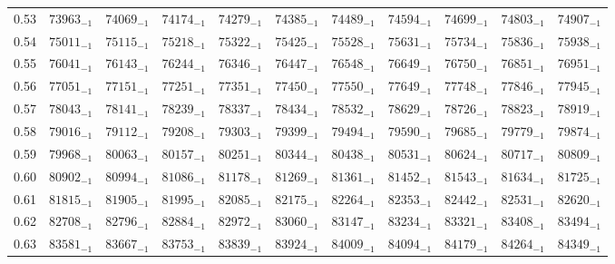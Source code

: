 \documentclass[10pt, a4paper]{article}
\begin{document}
\begin{center}
\begin{longtable}{c || c c c c c | c c c c c}
        0.53 & \({73963}_{-1}\) & \({74069}_{-1}\) & \({74174}_{-1}\) & \({74279}_{-1}\) & \({74385}_{-1}\) & \({74489}_{-1}\) & \({74594}_{-1}\) & \({74699}_{-1}\) & \({74803}_{-1}\) & \({74907}_{-1}\)\\
        0.54 & \({75011}_{-1}\) & \({75115}_{-1}\) & \({75218}_{-1}\) & \({75322}_{-1}\) & \({75425}_{-1}\) & \({75528}_{-1}\) & \({75631}_{-1}\) & \({75734}_{-1}\) & \({75836}_{-1}\) & \({75938}_{-1}\)\\
        0.55 & \({76041}_{-1}\) & \({76143}_{-1}\) & \({76244}_{-1}\) & \({76346}_{-1}\) & \({76447}_{-1}\) & \({76548}_{-1}\) & \({76649}_{-1}\) & \({76750}_{-1}\) & \({76851}_{-1}\) & \({76951}_{-1}\)\\
        0.56 & \({77051}_{-1}\) & \({77151}_{-1}\) & \({77251}_{-1}\) & \({77351}_{-1}\) & \({77450}_{-1}\) & \({77550}_{-1}\) & \({77649}_{-1}\) & \({77748}_{-1}\) & \({77846}_{-1}\) & \({77945}_{-1}\)\\
        0.57 & \({78043}_{-1}\) & \({78141}_{-1}\) & \({78239}_{-1}\) & \({78337}_{-1}\) & \({78434}_{-1}\) & \({78532}_{-1}\) & \({78629}_{-1}\) & \({78726}_{-1}\) & \({78823}_{-1}\) & \({78919}_{-1}\)\\
        0.58 & \({79016}_{-1}\) & \({79112}_{-1}\) & \({79208}_{-1}\) & \({79303}_{-1}\) & \({79399}_{-1}\) & \({79494}_{-1}\) & \({79590}_{-1}\) & \({79685}_{-1}\) & \({79779}_{-1}\) & \({79874}_{-1}\)\\
        0.59 & \({79968}_{-1}\) & \({80063}_{-1}\) & \({80157}_{-1}\) & \({80251}_{-1}\) & \({80344}_{-1}\) & \({80438}_{-1}\) & \({80531}_{-1}\) & \({80624}_{-1}\) & \({80717}_{-1}\) & \({80809}_{-1}\)\\
        \hline
        0.60 & \({80902}_{-1}\) & \({80994}_{-1}\) & \({81086}_{-1}\) & \({81178}_{-1}\) & \({81269}_{-1}\) & \({81361}_{-1}\) & \({81452}_{-1}\) & \({81543}_{-1}\) & \({81634}_{-1}\) & \({81725}_{-1}\)\\
        0.61 & \({81815}_{-1}\) & \({81905}_{-1}\) & \({81995}_{-1}\) & \({82085}_{-1}\) & \({82175}_{-1}\) & \({82264}_{-1}\) & \({82353}_{-1}\) & \({82442}_{-1}\) & \({82531}_{-1}\) & \({82620}_{-1}\)\\
        0.62 & \({82708}_{-1}\) & \({82796}_{-1}\) & \({82884}_{-1}\) & \({82972}_{-1}\) & \({83060}_{-1}\) & \({83147}_{-1}\) & \({83234}_{-1}\) & \({83321}_{-1}\) & \({83408}_{-1}\) & \({83494}_{-1}\)\\
        0.63 & \({83581}_{-1}\) & \({83667}_{-1}\) & \({83753}_{-1}\) & \({83839}_{-1}\) & \({83924}_{-1}\) & \({84009}_{-1}\) & \({84094}_{-1}\) & \({84179}_{-1}\) & \({84264}_{-1}\) & \({84349}_{-1}\)\\

\end{longtable}
\end{center}
\end{document}
